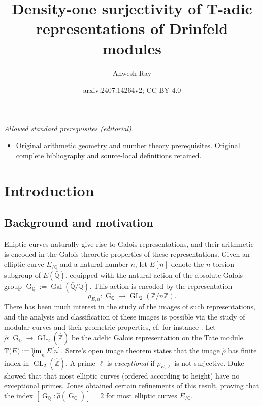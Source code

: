 \documentclass[11pt]{amsart}
\title{Density-one surjectivity of T-adic representations of Drinfeld modules}
\author{Anwesh Ray}
\date{arxiv:2407.14264v2; CC BY 4.0}
\newcommand{\Z}{\mathbb{Z}}
\newcommand{\Q}{\mathbb{Q}}
\newcommand{\op}[1]{\operatorname{#1}}
\numberwithin{equation}{section}
\begin{document}
\maketitle
\noindent\textit{Allowed standard prerequisites (editorial).}\begin{itemize}
\item Original arithmetic geometry and number theory prerequisites. Original complete bibliography and source-local definitions retained.
\end{itemize}\medskip
\section{Introduction}
\subsection{Background and motivation} Elliptic curves naturally give rise to Galois representations, and their arithmetic is encoded in the Galois theoretic properties of these representations. Given an elliptic curve $E_{/\Q}$ and a natural number $n$, let $E[n]$ denote the $n$-torsion subgroup of $E(\bar{\Q})$, equipped with the natural action of the absolute Galois group $\op{G}_{\Q}:=\op{Gal}(\bar{\Q}/\Q)$. This action is encoded by the representation 
\[\rho_{E, n}: \op{G}_{\Q}\rightarrow \op{GL}_2(\Z/n\Z).\] There has been much interest in the study of the images of such representations, and the analysis and classification of these images is possible via the study of modular curves and their geometric properties, cf. for instance \cite{Mazurmodcurves,Sutherland, zywina}. Let $\hat{\rho}:\op{G}_{\Q}\rightarrow \op{GL}_2(\widehat{\Z})$ be the adelic Galois representation on the Tate module $\mathbb{T}(E):=\varprojlim_n E[n]$. Serre's open image theorem states that the image $\hat{\rho}$ has finite index in $\op{GL}_2(\widehat{\Z})$. A prime $\ell$ is \emph{exceptional} if $\rho_{E, \ell}$ is not surjective. Duke \cite{duke1997elliptic} showed that that most elliptic curves (ordered according to height) have no exceptional primes. Jones \cite{Jones} obtained certain refinements of this result, proving that the index $[\op{G}_{\Q}:\hat{\rho}(\op{G}_{\Q})]=2$ for most elliptic curves $E_{/\Q}$. 
\end{document}
